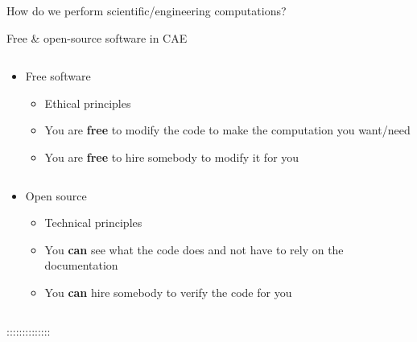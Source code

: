 \documentclass[
  ignorenonframetext,
  aspectratio=169,
]{beamer}
\providecommand{\tightlist}{%
  \setlength{\itemsep}{0pt}\setlength{\parskip}{0pt}}
\begin{document}
\begin{frame}{How do we perform scientific/engineering computations?}
\end{frame}

\begin{frame}{Free \& open-source software in CAE}
\protect\hypertarget{free-open-source-software-in-cae}{}
\begin{columns}[T]
\begin{column}{0.5\textwidth}
\begin{itemize}
\item
  Free software

  \begin{itemize}
  \tightlist
  \item
    Ethical principles
  \item
    You are \textbf{free} to modify the code to make the computation you
    want/need
  \item
    You are \textbf{free} to hire somebody to modify it for you
  \end{itemize}
\end{itemize}
\end{column}
\end{columns}

\begin{column}{0.5\textwidth}
\begin{itemize}
\item
  Open source

  \begin{itemize}
  \tightlist
  \item
    Technical principles
  \item
    You \textbf{can} see what the code does and not have to rely on the
    documentation
  \item
    You \textbf{can} hire somebody to verify the code for you
  \end{itemize}
\end{itemize}
\end{column}

::::::::::::::
\end{frame}
\end{document}
